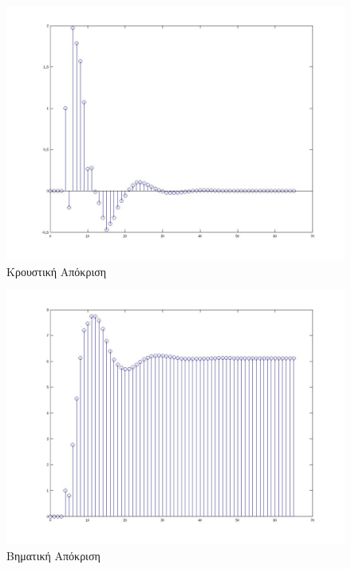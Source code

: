 \documentclass[a4paper,10pt]{article} \usepackage{anysize}
\begin{document}
\begin{figure}[H]
\caption{Κρουστική Απόκριση}
\centering
	\includegraphics[scale=0.4]{files/21-kroustikh_apokrish.jpg}
\end{figure}



\begin{figure}[H]
\caption{Βηματική Απόκριση}
\centering
	\includegraphics[scale=0.4]{files/22-bhmatikh_apokrish.jpg}
\end{figure}
\end{document}
